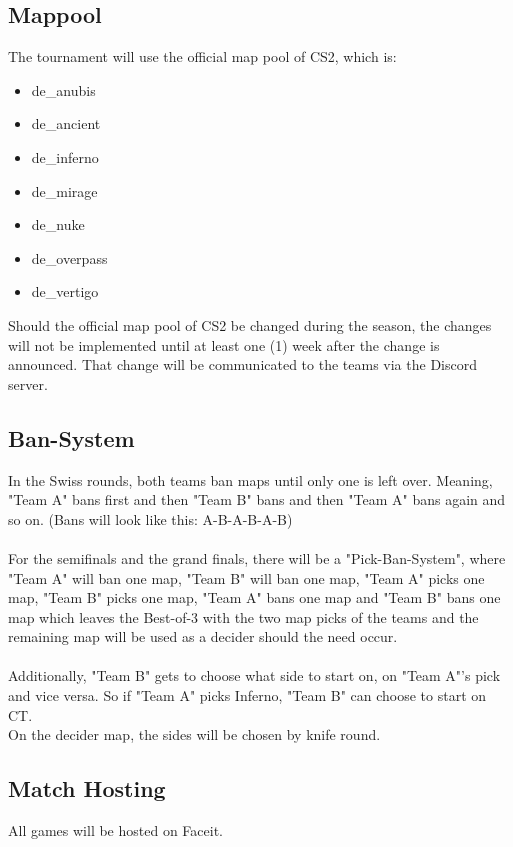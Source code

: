 \documentclass{article}
\begin{document}
\subsection{Mappool}
The tournament will use the official map pool of CS2, which is:
\begin{itemize}
    \item de\_anubis
    \item de\_ancient
    \item de\_inferno
    \item de\_mirage
    \item de\_nuke
    \item de\_overpass
    \item de\_vertigo 
\end{itemize}
Should the official map pool of CS2 be changed during the season, the changes will not be implemented until at least one (1) week after
the change is announced. That change will be communicated to the teams via the Discord server.



\subsection{Ban-System}
In the Swiss rounds, both teams ban maps until only one is left over. Meaning, "Team A" bans first and then "Team B" bans and then "Team A"
bans again and so on. (Bans will look like this: A-B-A-B-A-B)\\
\\
\noindent
For the semifinals and the grand finals, there will be a "Pick-Ban-System", where "Team A" will ban one map, "Team B" will ban one map, 
"Team A" picks one map, "Team B" picks one map, "Team A" bans one map and "Team B" bans one map which leaves the Best-of-3 with the 
two map picks of the teams and the remaining map will be used as a decider should the need occur. \\
\\
Additionally, "Team B" gets to choose what side to start on, on "Team A"'s pick and vice versa. So if "Team A" picks Inferno, "Team B" 
can choose to start on CT.\\
On the decider map, the sides will be chosen by knife round. 



\subsection{Match Hosting}
All games will be hosted on Faceit.
\end{document}
